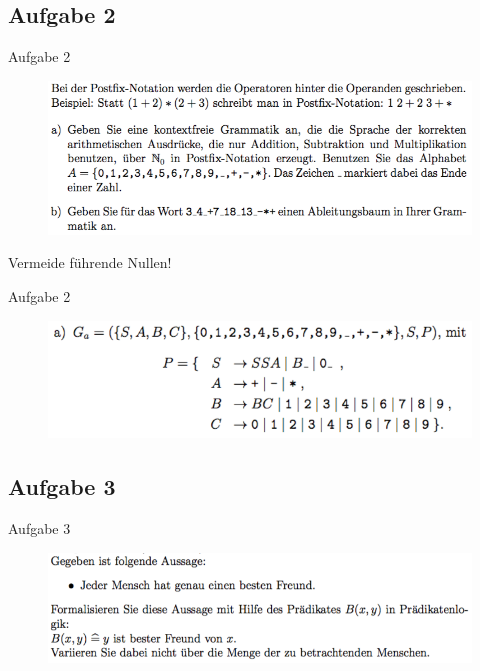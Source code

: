 \subsection{Aufgabe 2}
\begin{frame}{Aufgabe 2}
\begin{figure}[h!]
		\centering
		\includegraphics[width=\textwidth]{../topics/weihnachtstut-aufgaben/4.png} 
	\end{figure}     
Vermeide führende Nullen!
\end{frame}

\begin{frame}{Aufgabe 2}
\begin{figure}[h!]
		\centering
		\includegraphics[width=\textwidth]{../topics/weihnachtstut-aufgaben/5.png} 
	\end{figure}    
\end{frame}

\subsection{Aufgabe 3}
\begin{frame}{Aufgabe 3}
\begin{figure}[h!]
		\centering
		\includegraphics[width=\textwidth]{../topics/weihnachtstut-aufgaben/6.png} 
	\end{figure}     
\end{frame}

